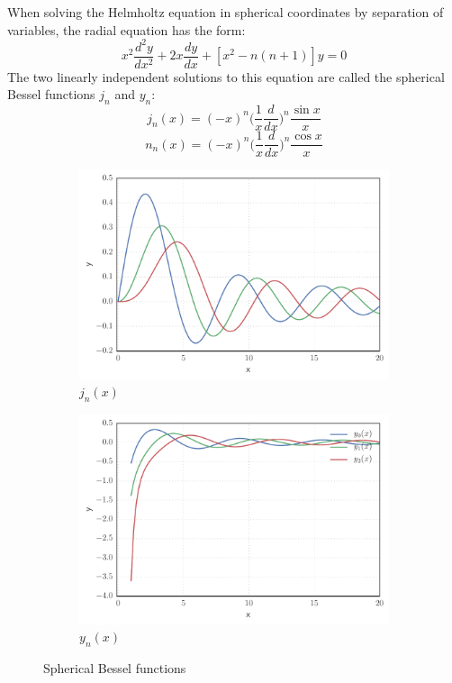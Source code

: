 \documentclass[a4paper, 12pt]{article}
\begin{document}
When solving the Helmholtz equation in spherical coordinates by separation of variables, the radial equation has the form:
$$x^2\frac{d^2 y}{dx^2}+2x\frac{dy}{dx}+[x^2-n(n+1)]y = 0$$
The two linearly independent solutions to this equation are called the spherical Bessel functions $j_n$ and $y_n$:
\begin{equation}\label{bess_func1}
	j_n(x) = (-x)^n\bigg(\frac{1}{x} \frac{d}{dx}\bigg)^n \frac{\sin{x}}{x}
\end{equation}
\begin{equation}\label{bess_func2}
	n_n(x) = (-x)^n\bigg(\frac{1}{x} \frac{d}{dx}\bigg)^n \frac{\cos{x}}{x}
\end{equation}
\begin{figure}[h!]
\centering
\begin{subfigure}{.5\textwidth}
  \centering
  \includegraphics[width=1.0\linewidth]{bessel1.pdf}
  \caption{$j_n(x)$}
  \label{fig1:bessel1}
\end{subfigure}%
\begin{subfigure}{.5\textwidth}
  \centering
  \includegraphics[width=1.0\linewidth]{bessel2.pdf}
  \caption{$y_n(x)$}
  \label{fig:bessel2}
\end{subfigure}
\caption{Spherical Bessel functions}
\label{fig:bessel}
\end{figure}
\end{document}
